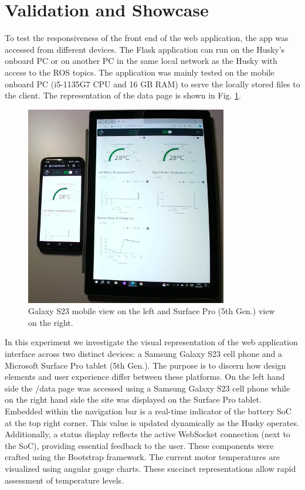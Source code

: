\documentclass[conference]{IEEEtran}
\begin{document}
\section{Validation and Showcase}\label{VS}
To test the responsiveness of the front end of the web application, the app was accessed from different devices. The Flask application can run on the Husky's onboard PC or on another PC in the same local network as the Husky with access to the ROS topics. The application was mainly tested on the mobile onboard PC (i5-1135G7 CPU and 16 GB RAM) to serve the locally stored files to the client.
The representation of the data page is shown in Fig. \ref{fig:galaxysurface}. 
\begin{figure}[htbp]
    \centerline{\includegraphics[width=8.8cm]{Pictures/galaxysurfacecut.png}}
    \caption{Galaxy S23 mobile view on the left and Surface Pro (5th Gen.) view on the right.}
    \label{fig:galaxysurface}
\end{figure}
In this experiment we investigate the visual representation of the web application interface across two distinct devices: a Samsung Galaxy S23 cell phone and a Microsoft Surface Pro tablet (5th Gen.). The purpose is to discern how design elements and user experience differ between these platforms.
On the left hand side the /data page was accessed using a Samsung Galaxy S23 cell phone while on the right hand side the site was displayed on the Surface Pro tablet.
Embedded within the navigation bar is a real-time indicator of the battery SoC at the top right corner. This value is updated dynamically as the Husky operates.
Additionally, a status display reflects the active WebSocket connection (next to the SoC), providing essential feedback to the user.
These components were crafted using the Bootstrap framework. The current motor temperatures are visualized using angular gauge charts. These succinct representations allow rapid assessment of temperature levels.
\end{document}
